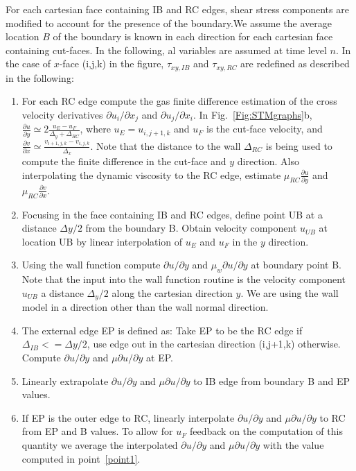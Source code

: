 For each cartesian face containing IB and RC edges, shear stress components are modified to account for the presence of the boundary.We assume the average location $B$ of the boundary is known in each direction for each cartesian face containing cut-faces. In the following, al variables are assumed at time level $n$. In the case of $x$-face (i,j,k) in the figure, $\tau_{xy,IB}$ and $\tau_{xy,RC}$ are redefined as described in the following:
%
\begin{enumerate}
    \item For each RC edge compute the gas finite difference estimation of the cross velocity derivatives $\partial u_i/\partial x_j$ and $\partial u_j/\partial x_i$. In Fig.~\ref{Fig:STMgraphs}b, $\frac{\partial u}{\partial y} \simeq 2 \frac{u_E-u_F}{\Delta_y + \Delta_{RC}}$, where $u_E=u_{i,j+1,k}$ and $u_F$ is the cut-face velocity, and $\frac{\partial v}{\partial x} \simeq \frac{v_{i+1,j,k}-v_{i,j,k}}{\Delta_x}$. Note that the distance to the wall $\Delta_{RC}$ is being used to compute the finite difference in the cut-face and $y$ direction. Also interpolating the dynamic viscosity to the RC edge, estimate $\mu_{RC} \frac{\partial u}{\partial y}$ and $\mu_{RC} \frac{\partial v}{\partial x}$. \label{point1}
     \item Focusing in the face containing IB and RC edges, define point UB at a distance $\Delta y/2$ from the boundary B. Obtain velocity component $u_{UB}$ at location UB by linear interpolation of $u_E$ and $u_F$ in the $y$ direction.
     \item Using the wall function compute $\partial u/\partial y$ and $\mu_w \partial u/\partial y$ at boundary point B. Note that the input into the wall function routine is the velocity component $u_{UB}$ a distance $\Delta_y/2$ along the cartesian direction $y$. We are using the wall model in a direction other than the wall normal direction. 
     \item The external edge EP is defined as: Take EP to be the RC edge if $\Delta_{IB} <= \Delta y/2$, use edge out in the cartesian direction (i,j+1,k) otherwise. Compute $\partial u/\partial y$ and $\mu \partial u/\partial y$ at EP.
     \item Linearly extrapolate $\partial u/\partial y$ and $\mu \partial u/\partial y$ to IB edge from boundary B and EP values.
     \item If EP is the outer edge to RC, linearly interpolate $\partial u/\partial y$ and $\mu \partial u/\partial y$ to RC from EP and B values. To allow for $u_F$ feedback on the computation of this quantity we average the interpolated $\partial u/\partial y$ and $\mu \partial u/\partial y$ with the value computed in point~\ref{point1}.
\end{enumerate}
%

